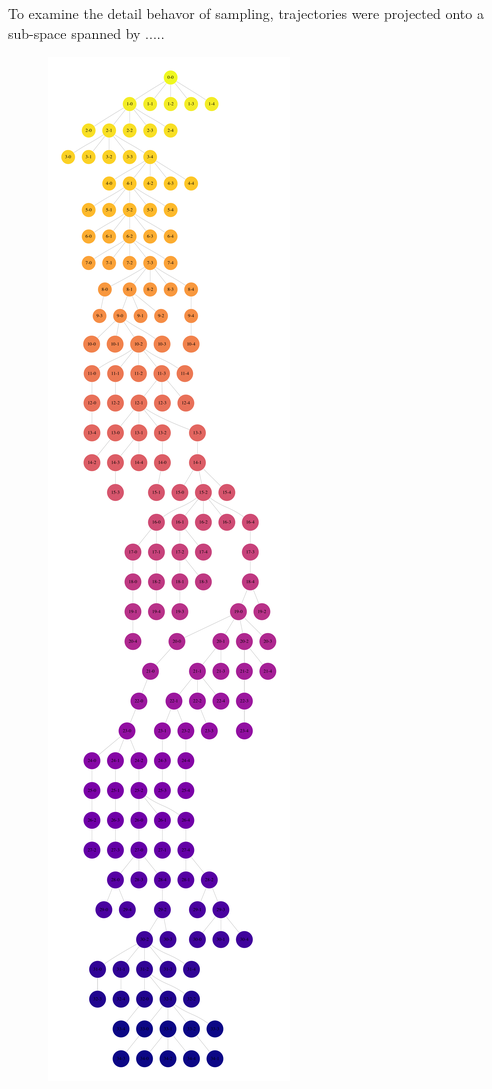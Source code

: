To examine the detail behavor of sampling, trajectories were projected onto a sub-space spanned by .....

\begin{figure}[t]
\centering
 \begin{minipage}{0.3\hsize}
 \centering
 \includegraphics[scale=0.08]{Figures/tree_chi_pacs_best.pdf}

\end{minipage}
\end{figure}
